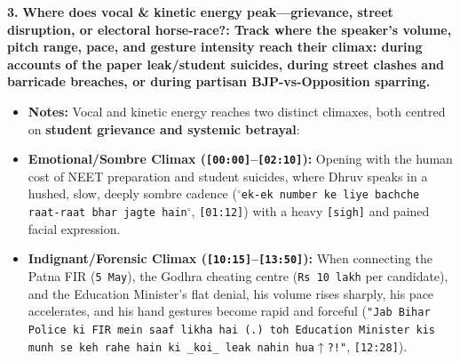 \documentclass[10pt,a4paper]{article}
\begin{document}
\noindent\textbf{3.} \textbf{Where does vocal \& kinetic energy peak---grievance, street disruption, or electoral horse-race?: Track where the speaker's volume, pitch range, pace, and gesture intensity reach their climax: during accounts of the paper leak/student suicides, during street clashes and barricade breaches, or during partisan BJP-vs-Opposition sparring.}\par\smallskip
\begin{itemize}
  \item \textbf{Notes:}
Vocal and kinetic energy reaches two distinct climaxes, both centred on \textbf{student grievance and systemic betrayal}:\par\smallskip
  \item \textbf{Emotional/Sombre Climax (\texttt{[00:00]}--\texttt{[02:10]}):} Opening with the human cost of NEET preparation and student suicides, where Dhruv speaks in a hushed, slow, deeply sombre cadence (\texttt{$^\circ$ek-ek number ke liye bachche raat-raat bhar jagte hain$^\circ$}, \texttt{[01:12]}) with a heavy \texttt{[sigh]} and pained facial expression.
  \item \textbf{Indignant/Forensic Climax (\texttt{[10:15]}--\texttt{[13:50]}):} When connecting the Patna FIR (\texttt{5 May}), the Godhra cheating centre (\texttt{Rs 10 lakh} per candidate), and the Education Minister's flat denial, his volume rises sharply, his pace accelerates, and his hand gestures become rapid and forceful (\texttt{"Jab Bihar Police ki FIR mein saaf likha hai (.) toh Education Minister kis munh se keh rahe hain ki \_koi\_ leak nahin hua$\uparrow$?!"}, \texttt{[12:28]}).
\end{itemize}
\end{document}
